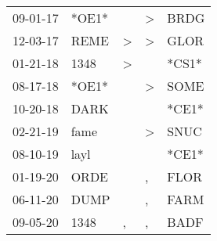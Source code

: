 \begin{supertabular}{p{0.07\textwidth}p{0.06\textwidth}p{0.02\textwidth}p{0.02\textwidth}p{0.06\textwidth}}
          09-01-17\textsuperscript{} &                            *OE1* &                  &     \textgreater &           BRDG\textsuperscript{} \\
          12-03-17\textsuperscript{} &           REME\textsuperscript{} &     \textgreater &     \textgreater &           GLOR\textsuperscript{} \\
          01-21-18\textsuperscript{} &           1348\textsuperscript{} &     \textgreater &                  &                            *CS1* \\
          08-17-18\textsuperscript{} &                            *OE1* &                  &     \textgreater &           SOME\textsuperscript{} \\
          10-20-18\textsuperscript{} &           DARK\textsuperscript{} &                  &                  &                            *CE1* \\
          02-21-19\textsuperscript{} &           fame\textsuperscript{} &                  &     \textgreater &           SNUC\textsuperscript{} \\
          08-10-19\textsuperscript{} &           layl\textsuperscript{} &                  &                  &                            *CE1* \\
          01-19-20\textsuperscript{} &           ORDE\textsuperscript{} &                  &                , &           FLOR\textsuperscript{} \\
          06-11-20\textsuperscript{} &           DUMP\textsuperscript{} &                  &                , &           FARM\textsuperscript{} \\
          09-05-20\textsuperscript{} &           1348\textsuperscript{} &                , &                , &           BADF\textsuperscript{} \\
\end{supertabular}
